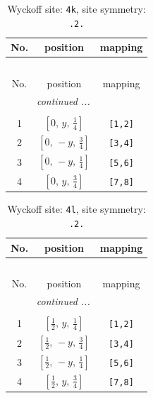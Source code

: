 \documentclass[fleqn,8pt]{jsarticle}
\begin{document}
\renewcommand{\arraystretch}{1.2}
\begin{longtable}{ccc}
\caption{Wyckoff site: {\tt 4k}, site symmetry: {\tt .2.}}
 \\
 \hline \hline
No. & position & mapping \\ \hline \endfirsthead

\multicolumn{2}{l}{\tablename\ \thetable{}} \\
 \hline \hline
No. & position & mapping \\ \hline \endhead

 \hline \hline
\multicolumn{2}{r}{\footnotesize\it continued ...} \\ \endfoot

 \hline \hline
\multicolumn{2}{r}{} \\ \endlastfoot

1 & $\left[ 0,\, y,\, \frac{1}{4} \right]$ & {\tt [1,2]} \\ \hline
2 & $\left[ 0,\, - y,\, \frac{3}{4} \right]$ & {\tt [3,4]} \\ \hline
3 & $\left[ 0,\, - y,\, \frac{1}{4} \right]$ & {\tt [5,6]} \\ \hline
4 & $\left[ 0,\, y,\, \frac{3}{4} \right]$ & {\tt [7,8]} \\
\end{longtable}
\renewcommand{\arraystretch}{1.2}
\begin{longtable}{ccc}
\caption{Wyckoff site: {\tt 4l}, site symmetry: {\tt .2.}}
 \\
 \hline \hline
No. & position & mapping \\ \hline \endfirsthead

\multicolumn{2}{l}{\tablename\ \thetable{}} \\
 \hline \hline
No. & position & mapping \\ \hline \endhead

 \hline \hline
\multicolumn{2}{r}{\footnotesize\it continued ...} \\ \endfoot

 \hline \hline
\multicolumn{2}{r}{} \\ \endlastfoot

1 & $\left[ \frac{1}{2},\, y,\, \frac{1}{4} \right]$ & {\tt [1,2]} \\ \hline
2 & $\left[ \frac{1}{2},\, - y,\, \frac{3}{4} \right]$ & {\tt [3,4]} \\ \hline
3 & $\left[ \frac{1}{2},\, - y,\, \frac{1}{4} \right]$ & {\tt [5,6]} \\ \hline
4 & $\left[ \frac{1}{2},\, y,\, \frac{3}{4} \right]$ & {\tt [7,8]} \\
\end{longtable}
\end{document}
